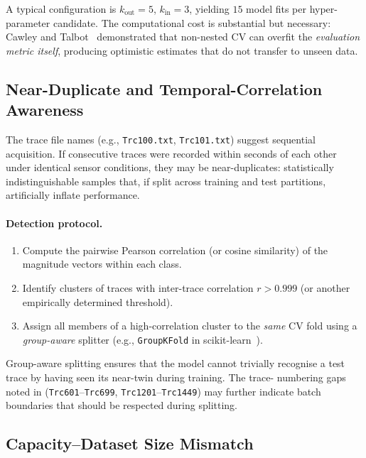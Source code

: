 A typical configuration is $k_{\text{out}} = 5$,
$k_{\text{in}} = 3$, yielding $15$ model fits per hyper-parameter
candidate.  The computational cost is substantial but necessary:
Cawley and Talbot~\cite{cawley2010overfitting} demonstrated that
non-nested CV can overfit the \emph{evaluation metric itself},
producing optimistic estimates that do not transfer to unseen data.

\subsection{Near-Duplicate and Temporal-Correlation Awareness}
\label{sec:overfit:duplicates}

The trace file names (e.g., \texttt{Trc100.txt}, \texttt{Trc101.txt})
suggest sequential acquisition.  If consecutive traces were recorded
within seconds of each other under identical sensor conditions, they may
be near-duplicates: statistically indistinguishable samples that, if
split across training and test partitions, artificially inflate
performance.

\paragraph{Detection protocol.}
\begin{enumerate}
  \item Compute the pairwise Pearson correlation (or cosine similarity)
        of the magnitude vectors within each class.
  \item Identify clusters of traces with inter-trace correlation
        $r > 0.999$ (or another empirically determined threshold).
  \item Assign all members of a high-correlation cluster to the
        \emph{same} CV fold using a \emph{group-aware} splitter (e.g.,
        \texttt{GroupKFold} in scikit-learn~\cite{sklearn_docs}).
\end{enumerate}

Group-aware splitting ensures that the model cannot trivially recognise
a test trace by having seen its near-twin during training.  The trace-
numbering gaps noted in  (\texttt{Trc601}--\texttt{Trc699},
\texttt{Trc1201}--\texttt{Trc1449}) may further indicate batch
boundaries that should be respected during splitting.

\subsection{Capacity--Dataset Size Mismatch}
\label{sec:overfit:capacity}

